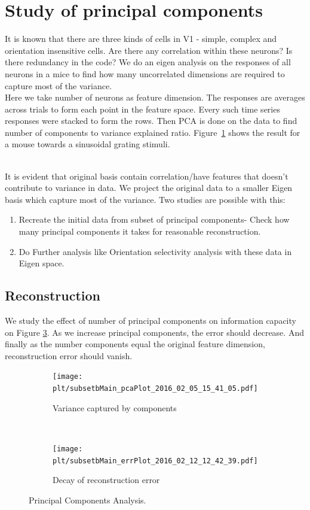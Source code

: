 \documentclass[11pt,paper=a4,answers]{exam}
\newcommand{\plt}{../../plots}
\begin{document}
\section{Study of principal components} %
\label{sec:study_of_correlation}
It is known that there are three kinds of cells in V1 - simple, complex and orientation insensitive cells. Are there any correlation within these neurons? Is there redundancy in the code? We do an eigen analysis on the responses of all neurons in a mice to find how many uncorrelated dimensions are required to capture most of the variance.\\
Here we take number of neurons as feature dimension. The responses are averages across trials to form each point in the feature space. Every such time series responses were stacked to form the rows. Then PCA is done on the data to find number of components to variance explained ratio. Figure~\ref{img:pca} shows the result for a mouse towards a sinusoidal grating stimuli.
\begin{figure}
    \centering

\end{figure}\\
It is evident that original basis contain correlation/have features that doesn't contribute to variance in data. We project the original data to a smaller Eigen basis which capture most of the variance. Two studies are possible with this:
\begin{enumerate}
    \item Recreate the initial data from subset of principal components- Check how many principal components it takes for reasonable reconstruction.
    \item Do Further analysis like Orientation selectivity analysis with these data in Eigen space.
\end{enumerate}
\subsection{Reconstruction} %
\label{sub:reconstruction}
We study the effect of number of principal components on information capacity on Figure \ref{img:reconstruction}. As we increase principal components, the error should decrease. And finally as the number components equal the original feature dimension, reconstruction error should vanish.
\begin{figure}
    \centering
    \begin{subfigure}[b]{.48\textwidth}
        \centering
        \texttt{[image: \\plt/subsetbMain\_pcaPlot\_2016\_02\_05\_15\_41\_05.pdf]}
        \caption{Variance captured by components}
        \label{img:pca}
    \end{subfigure}
    ~
    \begin{subfigure}[b]{.48\textwidth}
        \centering
        \texttt{[image: \\plt/subsetbMain\_errPlot\_2016\_02\_12\_12\_42\_39.pdf]}
        \caption{Decay of reconstruction error}
        \label{img:reconstruction}
    \end{subfigure}
    \caption{Principal Components Analysis.}
\end{figure}
\end{document}
